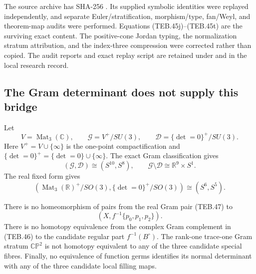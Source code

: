 \begin{auditrecord}
The source archive has SHA-256
.
Its supplied symbolic identities were replayed independently, and separate
Euler/stratification, morphism/type, fan/Weyl, and theorem-map audits were
performed.  Equations (TEB.45j)--(TEB.45t) are the surviving exact content.
The positive-cone Jordan typing, the normalization stratum attribution, and
the index-three compression were corrected rather than copied.  The audit
reports and exact replay script are retained under  and
 in the local
research record.
\end{auditrecord}

\subsection{The Gram determinant does not supply this bridge}
\label{subsec:teb-gram-obstructions}

Let
\[
 V=\operatorname{Mat}_3(\mathbb C),
 \qquad
 \mathcal G=V^+/SU(3),
 \qquad
 \mathcal D=\{\det=0\}^+/SU(3).
\]
Here \(V^+=V\cup\{\infty\}\) is the one-point compactification and
\(\{\det=0\}^+=\{\det=0\}\cup\{\infty\}\).
The exact Gram classification gives
\[
 (\mathcal G,\mathcal D)\cong(S^{10},S^8),
 \qquad
 \mathcal G\setminus\mathcal D\cong\mathbb R^9\times S^1.
 \tag{TEB.46}
\]
The real fixed form gives
\[
 \left(\operatorname{Mat}_3(\mathbb R)^+/SO(3),
       \{\det=0\}^+/SO(3)\right)
 \cong(S^6,S^5).                                       \tag{TEB.47}
\]

\begin{theorem}
\label{thm:teb-no-gram-identification}
There is no homeomorphism of pairs from the real Gram pair (TEB.47) to
\[
 \left(X,f^{-1}\{p_0,p_1,p_2\}\right).
 \tag{TEB.48}
\]
There is no homotopy equivalence from the complex Gram complement in
(TEB.46) to the candidate regular part \(f^{-1}(B^\circ)\).  The rank-one
trace-one Gram stratum \(\mathbb{CP}^2\) is not homotopy equivalent to any of
the three candidate special fibres.  Finally, no equivalence of function
germs identifies its normal determinant with any of the three candidate local
filling maps.
\end{theorem}

